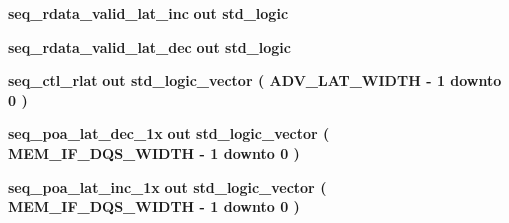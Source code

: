 \begin{DoxyCompactItemize}
\item 
{\bf seq\+\_\+rdata\+\_\+valid\+\_\+lat\+\_\+inc}  {\bfseries {\bfseries \textcolor{keywordflow}{out}\textcolor{vhdlchar}{ }}} {\bfseries \textcolor{comment}{std\+\_\+logic}\textcolor{vhdlchar}{ }} 
\item 
{\bf seq\+\_\+rdata\+\_\+valid\+\_\+lat\+\_\+dec}  {\bfseries {\bfseries \textcolor{keywordflow}{out}\textcolor{vhdlchar}{ }}} {\bfseries \textcolor{comment}{std\+\_\+logic}\textcolor{vhdlchar}{ }} 
\item 
{\bf seq\+\_\+ctl\+\_\+rlat}  {\bfseries {\bfseries \textcolor{keywordflow}{out}\textcolor{vhdlchar}{ }}} {\bfseries \textcolor{comment}{std\+\_\+logic\+\_\+vector}\textcolor{vhdlchar}{ }\textcolor{vhdlchar}{(}\textcolor{vhdlchar}{ }\textcolor{vhdlchar}{ }\textcolor{vhdlchar}{ }\textcolor{vhdlchar}{ }{\bfseries {\bf A\+D\+V\+\_\+\+L\+A\+T\+\_\+\+W\+I\+D\+TH}} \textcolor{vhdlchar}{-\/}\textcolor{vhdlchar}{ } \textcolor{vhdldigit}{1} \textcolor{vhdlchar}{ }\textcolor{keywordflow}{downto}\textcolor{vhdlchar}{ }\textcolor{vhdlchar}{ } \textcolor{vhdldigit}{0} \textcolor{vhdlchar}{ }\textcolor{vhdlchar}{)}\textcolor{vhdlchar}{ }} 
\item 
{\bf seq\+\_\+poa\+\_\+lat\+\_\+dec\+\_\+1x}  {\bfseries {\bfseries \textcolor{keywordflow}{out}\textcolor{vhdlchar}{ }}} {\bfseries \textcolor{comment}{std\+\_\+logic\+\_\+vector}\textcolor{vhdlchar}{ }\textcolor{vhdlchar}{(}\textcolor{vhdlchar}{ }\textcolor{vhdlchar}{ }\textcolor{vhdlchar}{ }\textcolor{vhdlchar}{ }{\bfseries {\bf M\+E\+M\+\_\+\+I\+F\+\_\+\+D\+Q\+S\+\_\+\+W\+I\+D\+TH}} \textcolor{vhdlchar}{-\/}\textcolor{vhdlchar}{ } \textcolor{vhdldigit}{1} \textcolor{vhdlchar}{ }\textcolor{keywordflow}{downto}\textcolor{vhdlchar}{ }\textcolor{vhdlchar}{ } \textcolor{vhdldigit}{0} \textcolor{vhdlchar}{ }\textcolor{vhdlchar}{)}\textcolor{vhdlchar}{ }} 
\item 
{\bf seq\+\_\+poa\+\_\+lat\+\_\+inc\+\_\+1x}  {\bfseries {\bfseries \textcolor{keywordflow}{out}\textcolor{vhdlchar}{ }}} {\bfseries \textcolor{comment}{std\+\_\+logic\+\_\+vector}\textcolor{vhdlchar}{ }\textcolor{vhdlchar}{(}\textcolor{vhdlchar}{ }\textcolor{vhdlchar}{ }\textcolor{vhdlchar}{ }\textcolor{vhdlchar}{ }{\bfseries {\bf M\+E\+M\+\_\+\+I\+F\+\_\+\+D\+Q\+S\+\_\+\+W\+I\+D\+TH}} \textcolor{vhdlchar}{-\/}\textcolor{vhdlchar}{ } \textcolor{vhdldigit}{1} \textcolor{vhdlchar}{ }\textcolor{keywordflow}{downto}\textcolor{vhdlchar}{ }\textcolor{vhdlchar}{ } \textcolor{vhdldigit}{0} \textcolor{vhdlchar}{ }\textcolor{vhdlchar}{)}\textcolor{vhdlchar}{ }} 
\item 

\end{DoxyCompactItemize}
